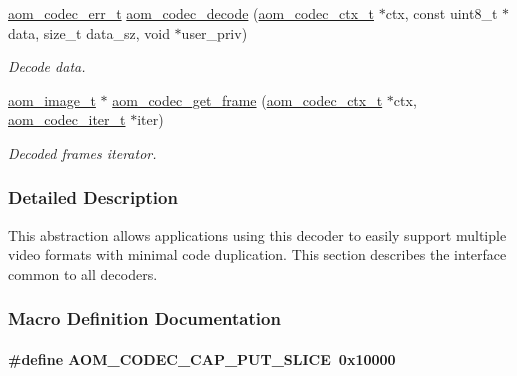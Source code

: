 \begin{DoxyCompactItemize}
\hyperlink{group__codec_gaaae61e0f8663e6137f1e228757248e7c}{aom\+\_\+codec\+\_\+err\+\_\+t} \hyperlink{group__decoder_gab03fdb999d1f83a5896869a3ba5f68f7}{aom\+\_\+codec\+\_\+decode} (\hyperlink{group__codec_ga9a1d27f9742d9f70783e3c6cb849b5b4}{aom\+\_\+codec\+\_\+ctx\+\_\+t} $\ast$ctx, const uint8\+\_\+t $\ast$data, size\+\_\+t data\+\_\+sz, void $\ast$user\+\_\+priv)
\begin{DoxyCompactList}\small\item\em Decode data. \end{DoxyCompactList}\item 
\hyperlink{aom__image_8h_a5409ae8fdb326fe1cc32622ef4e23748}{aom\+\_\+image\+\_\+t} $\ast$ \hyperlink{group__decoder_ga780aad27a2728abefab725faa3bc4f79}{aom\+\_\+codec\+\_\+get\+\_\+frame} (\hyperlink{group__codec_ga9a1d27f9742d9f70783e3c6cb849b5b4}{aom\+\_\+codec\+\_\+ctx\+\_\+t} $\ast$ctx, \hyperlink{group__codec_gadf9e173c9e02788a9999399edab20a02}{aom\+\_\+codec\+\_\+iter\+\_\+t} $\ast$iter)
\begin{DoxyCompactList}\small\item\em Decoded frames iterator. \end{DoxyCompactList}\end{DoxyCompactItemize}


\subsubsection{Detailed Description}
This abstraction allows applications using this decoder to easily support multiple video formats with minimal code duplication. This section describes the interface common to all decoders. 

\subsubsection{Macro Definition Documentation}
\paragraph[{\texorpdfstring{A\+O\+M\+\_\+\+C\+O\+D\+E\+C\+\_\+\+C\+A\+P\+\_\+\+P\+U\+T\+\_\+\+S\+L\+I\+CE}{AOM_CODEC_CAP_PUT_SLICE}}]{\setlength{\rightskip}{0pt plus 5cm}\#define A\+O\+M\+\_\+\+C\+O\+D\+E\+C\+\_\+\+C\+A\+P\+\_\+\+P\+U\+T\+\_\+\+S\+L\+I\+CE~0x10000}\hypertarget{group__decoder_ga1e50f39bf0434fc5d18aeed80e06d044}{}\label{group__decoder_ga1e50f39bf0434fc5d18aeed80e06d044}


